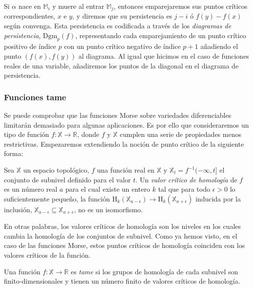 Si $\alpha$ nace en $\mathbb{M}_i$ y muere al entrar $\mathbb{M}_j$, entonces emparejaremos sus puntos críticos correspondientes, $x$ e $y$, y diremos que su persistencia es $j-i$ ó $f(y)-f(x)$ según convenga. Esta persistencia es codificada a través de los \emph{diagramas de persistencia}, $\text{Dgm}_p(f)$, representando cada emparejamiento de un punto crítico positivo de índice $p$ con un punto crítico negativo de índice $p+1$ añadiendo el punto $(f(x),f(y))$ al diagrama. Al igual que hicimos en el caso de funciones reales de una variable, añadiremos los puntos de la diagonal en el diagrama de persistencia.

\subsubsection*{Funciones tame}
Se puede comprobar que las funciones Morse sobre variedades diferenciables limitarán demasiado para algunas aplicaciones. Es por ello que consideraremos un tipo de función $f: \mathbb{X} \to \mathbb{R}$, donde $f$ y $\mathbb{X}$ cumplen una serie de propiedades menos restrictivas. Empezaremos extendiendo la noción de punto crítico de la siguiente forma:

\begin{definition}
\begin{sloppypar}
Sea $\mathbb{X}$ un espacio topológico, $f$ una función real en $\mathbb{X}$ y ${\mathbb{X}_t=f^{-1}(-\infty, t]}$ el conjunto de subnivel definido para el valor $t$. Un \emph{valor crítico de homología} de $f$ es un número real $a$ para el cual existe un entero $k$ tal que para todo $\epsilon > 0$ lo suficientemente pequeño, la función $\text{H}_k(\mathbb{X}_{a-\epsilon}) \to \text{H}_k(\mathbb{X}_{a+\epsilon})$ inducida por la inclusión, $\mathbb{X}_{a-\epsilon} \subseteq \mathbb{X}_{a+\epsilon}$, no es un isomorfismo.
\end{sloppypar}
\end{definition}

En otras palabras, los valores críticos de homología son los niveles en los cuales cambia la homología de los conjuntos de subnivel. Como ya hemos visto, en el caso de las funciones Morse, estos puntos críticos de homología coinciden con los valores críticos de la función.


\begin{definition}
Una función $f: \mathbb{X} \to \mathbb{R}$ es \emph{tame} si los grupos de homología de cada subnivel son finito-dimensionales y tienen un número finito de valores críticos de homología.
\end{definition}

